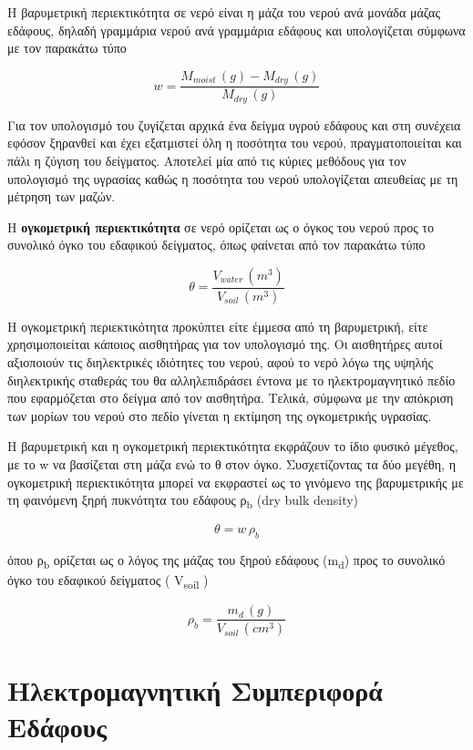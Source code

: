 Η βαρυμετρική περιεκτικότητα σε νερό είναι η μάζα του νερού ανά μονάδα
μάζας εδάφους, δηλαδή γραμμάρια νερού ανά γραμμάρια εδάφους και
υπολογίζεται σύμφωνα με τον παρακάτω τύπο

\[w = \frac{M_{moist}\,(g) - M_{dry}\,(g)}{M_{dry}\,(g)} \tag{2.1}\]

Για τον υπολογισμό του ζυγίζεται αρχικά ένα δείγμα υγρού εδάφους και στη
συνέχεια εφόσον ξηρανθεί και έχει εξατμιστεί όλη η ποσότητα του νερού,
πραγματοποιείται και πάλι η ζύγιση του δείγματος. Αποτελεί μία από τις
κύριες μεθόδους για τον υπολογισμό της υγρασίας καθώς η ποσότητα του
νερού υπολογίζεται απευθείας με τη μέτρηση των μαζών. \cite{ref05}

Η \textbf{ογκομετρική περιεκτικότητα} σε νερό ορίζεται ως ο όγκος του
νερού προς το συνολικό όγκο του εδαφικού δείγματος, όπως φαίνεται από
τον παρακάτω τύπο

\[\theta = \frac{V_{water}\,\left( m^{3} \right)}{V_{soil}\,\left( m^{3} \right)}\tag{2.2}\]

Η ογκομετρική περιεκτικότητα προκύπτει είτε έμμεσα από τη βαρυμετρική,
είτε χρησιμοποιείται κάποιος αισθητήρας για τον υπολογισμό της. Οι
αισθητήρες αυτοί αξιοποιούν τις διηλεκτρικές ιδιότητες του νερού, αφού
το νερό λόγω της υψηλής διηλεκτρικής σταθεράς του θα αλληλεπιδράσει
έντονα με το ηλεκτρομαγνητικό πεδίο που εφαρμόζεται στο δείγμα από τον
αισθητήρα. Τελικά, σύμφωνα με την απόκριση των μορίων του νερού στο
πεδίο γίνεται η εκτίμηση της ογκομετρικής υγρασίας. \cite{ref19}

Η βαρυμετρική και η ογκομετρική περιεκτικότητα εκφράζουν το ίδιο φυσικό
μέγεθος, με το w να βασίζεται στη μάζα ενώ το θ στον όγκο. Συσχετίζοντας
τα δύο μεγέθη, η ογκομετρική περιεκτικότητα μπορεί να εκφραστεί ως το
γινόμενο της βαρυμετρικής με τη φαινόμενη ξηρή πυκνότητα του εδάφους
ρ\textsubscript{b} (dry bulk density)

\[\theta = w\,\rho_{b} \tag{2.3}\]

όπου ρ\textsubscript{b} ορίζεται ως ο λόγος της μάζας του ξηρού εδάφους
(m\textsubscript{d}) προς το συνολικό όγκο του εδαφικού δείγματος (
V\textsubscript{soil} ) \cite{ref05,ref06}

\[\rho_{b} = \frac{m_{d}\,(g)}{V_{soil}\,\left( cm^{3} \right)} \tag{2.4}\]

\section{Ηλεκτρομαγνητική Συμπεριφορά Εδάφους}

